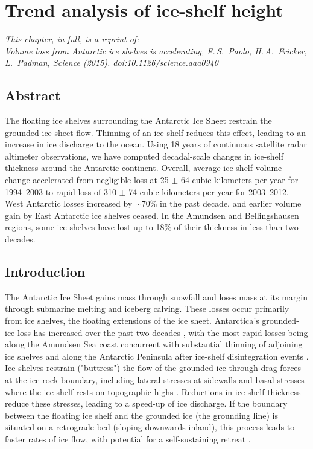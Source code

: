 


\chapter{Trend analysis of ice-shelf height}

{\sl
\noindent
This chapter, in full, is a reprint of:\\
Volume loss from Antarctic ice shelves is accelerating, F.\,S.~Paolo, H.\,A.~Fricker, L.~Padman, {\rm Science} (2015). doi:10.1126/science.aaa0940
}

\section{Abstract}

The floating ice shelves surrounding the Antarctic Ice Sheet restrain the
grounded ice-sheet flow. Thinning of an ice shelf reduces this effect, leading
to an increase in ice discharge to the ocean. Using 18 years of continuous
satellite radar altimeter observations, we have computed decadal-scale changes
in ice-shelf thickness around the Antarctic continent. Overall, average
ice-shelf volume change accelerated from negligible loss at 25 $\pm$ 64 cubic
kilometers per year for 1994--2003 to rapid loss of 310 $\pm$ 74 cubic
kilometers per year for 2003--2012. West Antarctic losses increased by
$\sim$70\% in the past decade, and earlier volume gain by East Antarctic ice
shelves ceased. In the Amundsen and Bellingshausen regions, some ice shelves
have lost up to 18\% of their thickness in less than two decades.

\section{Introduction}

The Antarctic Ice Sheet gains mass through snowfall and loses
mass at its margin through submarine melting and iceberg calving. These losses
occur primarily from ice shelves, the floating extensions of the ice sheet.
Antarctica's grounded-ice loss has increased over the past two decades
\parencite{Shepherd2012, Sutterley2014}, with the most rapid losses being along
the Amundsen Sea coast \parencite{Joughin2011} concurrent with substantial
thinning of adjoining ice shelves \parencite{Shepherd2010, Pritchard2012} and
along the Antarctic Peninsula after ice-shelf disintegration events \parencite{
Scambos2004}. Ice shelves restrain ("buttress") the flow of the grounded ice
through drag forces at the ice-rock boundary, including lateral stresses at
sidewalls and basal stresses where the ice shelf rests on topographic highs
\parencite{Schoof2007, Goldberg2009}. Reductions in ice-shelf thickness reduce
these stresses, leading to a speed-up of ice discharge. If the boundary between
the floating ice shelf and the grounded ice (the grounding line) is situated on
a retrograde bed (sloping downwards inland), this process leads to faster rates
of ice flow, with potential for a self-sustaining retreat \parencite{
Schoof2007, Favier2014, Joughin2014}.

